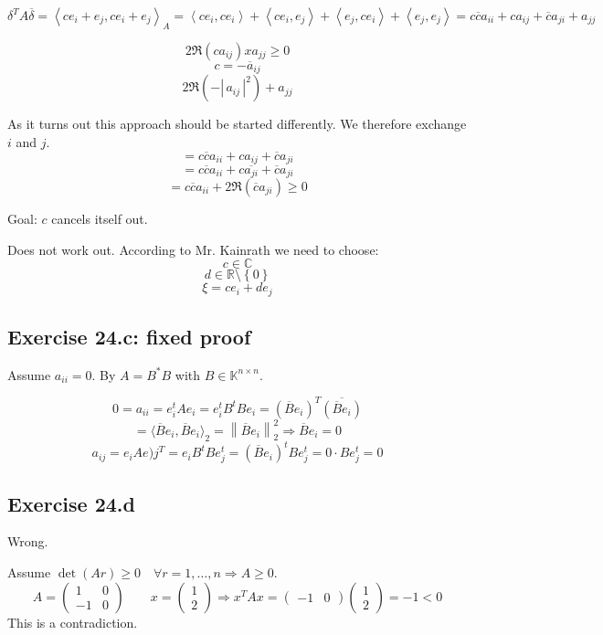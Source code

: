 \documentclass[a4paper]{article}
\theoremstyle{definition}
\newcommand\abs[1]{|\,#1\,|}
\newcommand\set[1]{\left\{#1\right\}}
\newcommand\fun[1]{\left\langle{#1}\right\rangle}
\newcommand\norm[1]{\left\|{#1}\right\|}
\begin{document}

\[
  \delta^T A\overline{\delta} = \fun{c e_i + e_j, c e_{i} + e_j}_A
    = \fun{c e_i, ce_i} + \fun{ce_i, e_j} + \fun{e_j, ce_i} + \fun{e_j, e_j}
    = c \overline{c} a_{ii} + ca_{ij} + \overline{c} a_{ji} + a_{jj}
\]

\[ 2 \Re(ca_{ij}) xa_{jj} \geq 0 \]
\[ c = -\overline{a}_{ij} \]
\[ 2\Re(-\abs{a_{ij}}^2) + a_{jj} \]

As it turns out this approach should be started differently.
We therefore exchange $i$ and $j$.
\[ = c \overline{c} a_{ii} + ca_{ij} + \overline{c} a_{ji} \]
\[ = c \overline{c} a_{ii} + c \overline{a_{ji}} + \overline{c} a_{ji} \]
\[ = c \overline{c} a_{ii} + 2 \Re(\overline{c} a_{ji}) \geq 0 \]

Goal: $c$ cancels itself out.

Does not work out. According to Mr. Kainrath we need to choose:
\[ c \in \mathbb C \]
\[ d \in \mathbb R \setminus \set{0} \]
\[ \xi = ce_i + de_j \]

\subsection{Exercise 24.c: fixed proof}
%
Assume $a_{ii} = 0$. By $A = B^* B$ with $B \in \mathbb K^{n\times n}$.

\[
  0 = a_{ii} = e_i^t A e_i = e_i^t B^t B e_i = (\overline{B} e_i)^T \overline{(\overline{B} e_i)}
\] \[
  = \langle \overline{B} e_i, \overline{B} e_i\rangle_2 = \norm{\overline{B} e_i}_2^2
  \Rightarrow \overline{B} e_i = 0
\] \[
  a_{ij} = e_i A e)j^T = e_i B^t B e^t_j = (\overline{B} e_i)^t B e_j^t = 0 \cdot B e_j^t = 0
\]

\subsection{Exercise 24.d}
%
Wrong.

Assume $\det(Ar) \geq 0 \quad \forall r = 1, \ldots, n \Rightarrow A \geq 0$.
\[
  A = \begin{pmatrix} 1 & 0 \\ -1 & 0 \end{pmatrix}
  \qquad
  x = \begin{pmatrix} 1 \\ 2 \end{pmatrix} \Rightarrow x^T Ax = \begin{pmatrix} -1 & 0 \end{pmatrix} \begin{pmatrix} 1 \\ 2 \end{pmatrix} = -1 < 0
\]
This is a contradiction.
\end{document}

